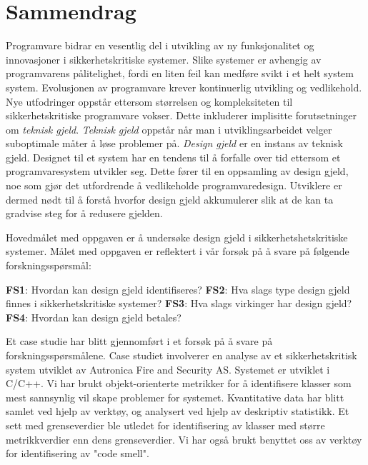 

\section*{\Huge Sammendrag}
Programvare bidrar en vesentlig del i utvikling av ny funksjonalitet og innovasjoner i sikkerhetskritiske systemer. Slike systemer er avhengig av programvarens pålitelighet, fordi en liten feil kan medføre svikt i et helt system system. Evolusjonen av programvare krever kontinuerlig utvikling og vedlikehold. Nye utfodringer oppstår ettersom størrelsen og kompleksiteten til sikkerhetskritiske programvare vokser. Dette inkluderer implisitte forutsetninger om \textit{teknisk gjeld}. \textit{Teknisk gjeld} oppstår når man i utviklingsarbeidet velger suboptimale måter å løse problemer på. \textit{Design gjeld} er en instans av teknisk gjeld. Designet til et system har en tendens til å forfalle over tid ettersom et programvaresystem utvikler seg. Dette fører til en oppsamling av design gjeld, noe som gjør det utfordrende å vedlikeholde programvaredesign. Utviklere er dermed nødt til å forstå hvorfor design gjeld akkumulerer slik at de kan ta gradvise steg for å redusere gjelden. 

Hovedmålet med oppgaven er å undersøke design gjeld i sikkerhetshetskritiske systemer. Målet med oppgaven er reflektert i vår forsøk på å svare på følgende forskningsspørsmål: \newline

\textbf{FS1}: Hvordan kan design gjeld identifiseres? \newline
\textbf{FS2}: Hva slags type design gjeld finnes i sikkerhetskritiske systemer? \newline
\textbf{FS3}: Hva slags virkinger har design gjeld? \newline
\textbf{FS4}: Hvordan kan design gjeld betales? \newline

Et case studie har blitt gjennomført i et forsøk på å svare på forskningsspørsmålene. Case studiet involverer en analyse av et sikkerhetskritisk system utviklet av Autronica Fire and Security AS. Systemet er utviklet i C/C++. Vi har brukt objekt-orienterte metrikker for å identifisere klasser som mest sannsynlig vil skape problemer for systemet. Kvantitative data har blitt samlet ved hjelp av verktøy, og analysert ved hjelp av deskriptiv statistikk. Et sett med grenseverdier ble utledet for identifisering av klasser med større metrikkverdier enn dens grenseverdier. Vi har også brukt benyttet oss av verktøy for identifisering av "code smell".

